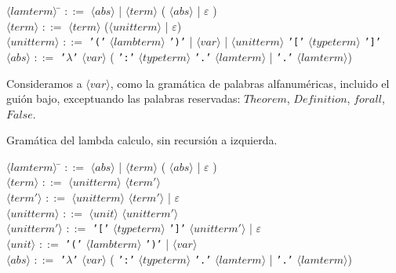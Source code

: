 \documentclass[a4paper,11pt]{article}
\theoremstyle{definition}
\begin{document}
\begin{tabbing}
$\langle lamterm \rangle$ \= $::=$ $\langle abs \rangle$ | $\langle term \rangle$ ( $\langle abs \rangle$ | $\varepsilon$ ) \\

$\langle term \rangle$ \> $::=$ $\langle term \rangle$ ($\langle unitterm \rangle$ | $\varepsilon$) \\

$\langle unitterm \rangle$ \> $::=$ \texttt{'('} $\langle lambterm \rangle$ \texttt{')'} |
$\langle var \rangle$ | $\langle unitterm \rangle$ \texttt{'['} $\langle typeterm \rangle$ \texttt{']'}\\

$\langle abs \rangle$ \> $::=$ \texttt{'$\lambda$'} $\langle var \rangle$ ( \texttt{':'} $\langle typeterm \rangle$ \texttt{'.'} $\langle lamterm \rangle$
| \texttt{'.'} $\langle lamterm \rangle$)
\end{tabbing}

Consideramos a $\langle var \rangle$, como la gramática de palabras alfanuméricas, incluido el guión bajo, exceptuando
las palabras reservadas: $Theorem$, $Definition$, $forall$, $False$.

Gramática del lambda calculo, sin recursión a izquierda.

\begin{tabbing}
$\langle lamterm \rangle$ \= $::=$ $\langle abs \rangle$ | $\langle term \rangle$ ( $\langle abs \rangle$ | $\varepsilon$ ) \\

$\langle term \rangle$ \> $::=$ $\langle unitterm \rangle$ $\langle term' \rangle$ \\

$\langle term' \rangle$ \> $::=$  $\langle unitterm \rangle$  $\langle term' \rangle$ | $\varepsilon$ \\

$\langle unitterm \rangle$ \> $::=$ $\langle unit \rangle$ $\langle unitterm' \rangle$ \\

$\langle unitterm' \rangle$ \> $::=$ \texttt{'['} $\langle typeterm \rangle$ \texttt{']'} $\langle unitterm' \rangle$ | $\varepsilon$ \\

$\langle unit \rangle$ \> $::=$ \texttt{'('} $\langle lambterm \rangle$ \texttt{')'} | $\langle var \rangle$ \\

$\langle abs \rangle$ \> $::=$ \texttt{'$\lambda$'} $\langle var \rangle$ ( \texttt{':'} $\langle typeterm \rangle$ \texttt{'.'} $\langle lamterm \rangle$
| \texttt{'.'} $\langle lamterm \rangle$)
\end{tabbing}
\end{document}
